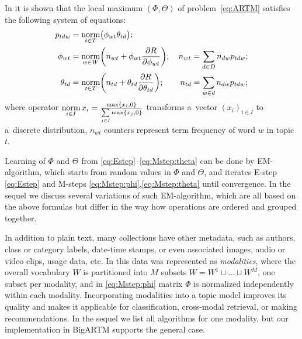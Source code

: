 \documentclass[russian,english]{llncs}
\newcommand{\norm}{\mathop{\rm norm}\limits}
\begin{document}
In \cite{voron14dan-eng} it is shown that the \mbox{local} maximum $(\Phi,\Theta)$
of problem~\eqref{eq:ARTM} satisfies
the following system of equations:
\begin{align}
    \label{eq:Estep}
    p_{tdw} &= \norm_{t\in T} \bigl(\phi_{wt}\theta_{td}\bigr);
\\
    \label{eq:Mstep:phi}
    \phi_{wt} &= \norm_{w\in W}
        \biggl(
            n_{wt} + \phi_{wt} \frac{\partial R}{\partial \phi_{wt}}
        \biggr);
        \quad
            n_{wt} = \sum_{d\in D} n_{dw} p_{tdw};
\\
    \label{eq:Mstep:theta}
    \theta_{td} &= \norm_{t\in T}
        \biggl(
            n_{td} + \theta_{td} \frac{\partial R}{\partial \theta_{td}}
        \biggr);
        \quad\quad
            n_{td} = \sum_{w\in d} n_{dw} p_{tdw};
\end{align}
where operator
$\norm_{i \in I} x_i = \frac{\max\{x_i,0\}}{\sum\limits_{j\in I} \max\{x_j,0\}}$
transforms a~vector $(x_i)_{i \in I}$ to a~discrete distribution,
$n_{wt}$ counters represent term frequency of word $w$ in topic $t$.

Learning of $\Phi$ and $\Theta$ from \eqref{eq:Estep}--\eqref{eq:Mstep:theta} can be done by EM-algorithm,
which starts from random values in $\Phi$ and $\Theta$, and iterates
E-step \eqref{eq:Estep} and
M-steps \eqref{eq:Mstep:phi},\eqref{eq:Mstep:theta}
until convergence.
In the sequel we discuss several variations of such EM-algorithm,
which are all based on the above formulas but differ in the way how operations are ordered and grouped together.

In addition to plain text, many collections have other metadata,
such as authors, class or category labels, date-time stamps,
or even associated images, audio or video clips, usage data, etc.
In \cite{voron15nonbayesian} this data was represented as \emph{modalities},
where the overall vocabulary $W$ is partitioned into $M$ subsets
$W = W^1 \sqcup \dots \sqcup W^M$, one subset per modality,
and in \eqref{eq:Mstep:phi} matrix $\Phi$ is normalized independently 
within each modality.
Incorporating modalities into a topic model improves its quality
and makes it applicable for classification, cross-modal retrieval, or making recommendations.
In the sequel we list all algorithms for one modality,
but our implementation in BigARTM supports the general case.
\end{document}
